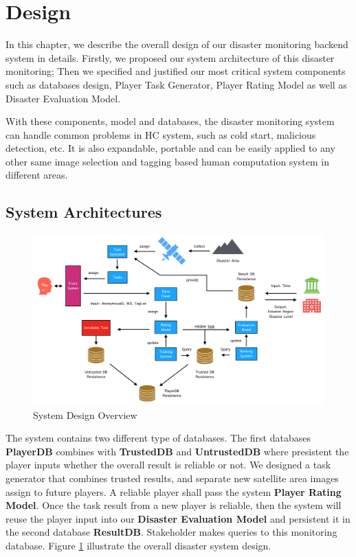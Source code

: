 \section{Design}

In this chapter, we describe the overall design of our disaster monitoring backend system in details.
Firstly, we proposed our system architecture of this disaster monitoring;
Then we specified and justified our most critical system components such as databases design, 
Player Task Generator, Player Rating Model as well as Disaster Evaluation Model.

With these components, model and databases, the disaster monitoring system can handle
common problems in HC system, such as cold start, malicious detection, etc. It is also expandable,
portable and can be easily applied to any other same image selection and tagging based
human computation system in different areas.

\subsection{System Architectures}

\begin{figure}[htp]
\centering
\includegraphics[width=\textwidth]{figures/system2}
\caption{System Design Overview}
\label{fig:arch}
\end{figure}

The system contains two different type of databases. The first databases \textbf{PlayerDB}
combines with \textbf{TrustedDB} and \textbf{UntrustedDB} where presistent 
the player inputs whether the overall result is reliable or not. 
We designed a task generator that combines trusted results, and separate new satellite area images assign to future players. 
A reliable player shall pass the system \textbf{Player Rating Model}. 
Once the task result from a new player is reliable, then the system will reuse 
the player input into our \textbf{Disaster Evaluation Model} and persistent it 
in the second database \textbf{ResultDB}. Stakeholder makes queries to this monitoring database. 
Figure \ref{fig:arch} illustrate the overall disaster system design.

